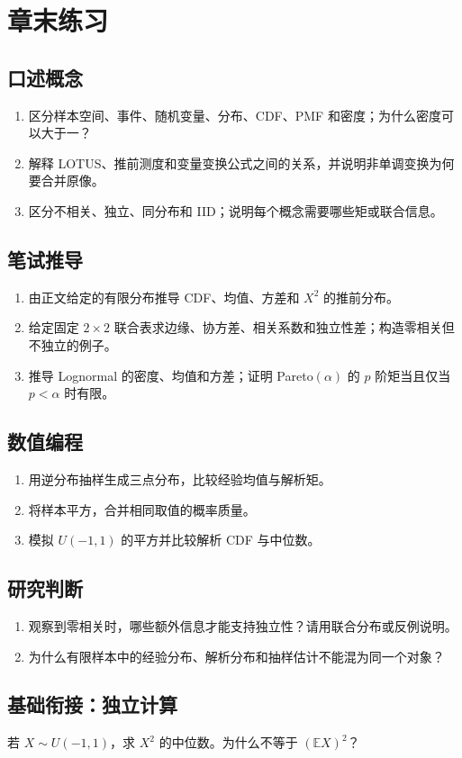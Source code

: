 \section*{章末练习}
\begingroup\small
\subsection*{口述概念}
\begin{enumerate}[nosep,leftmargin=*]
  \item 区分样本空间、事件、随机变量、分布、CDF、PMF 和密度；为什么密度可以大于一？
  \item 解释 LOTUS、推前测度和变量变换公式之间的关系，并说明非单调变换为何要合并原像。
  \item 区分不相关、独立、同分布和 IID；说明每个概念需要哪些矩或联合信息。
\end{enumerate}

\subsection*{笔试推导}
\begin{enumerate}[nosep,leftmargin=*]
  \item 由正文给定的有限分布推导 CDF、均值、方差和 $X^2$ 的推前分布。
  \item 给定固定 $2\times2$ 联合表求边缘、协方差、相关系数和独立性差；构造零相关但不独立的例子。
  \item 推导 Lognormal 的密度、均值和方差；证明 Pareto$(\alpha)$ 的 $p$ 阶矩当且仅当 $p<\alpha$ 时有限。
\end{enumerate}

\subsection*{数值编程}
\begin{enumerate}[leftmargin=*]
  \item 用逆分布抽样生成三点分布，比较经验均值与解析矩。
  \item 将样本平方，合并相同取值的概率质量。
  \item 模拟 $U(-1,1)$ 的平方并比较解析 CDF 与中位数。
\end{enumerate}

\subsection*{研究判断}
\begin{enumerate}[nosep,leftmargin=*]
  \item 观察到零相关时，哪些额外信息才能支持独立性？请用联合分布或反例说明。
  \item 为什么有限样本中的经验分布、解析分布和抽样估计不能混为同一个对象？
\end{enumerate}

\endgroup


\MFQMappedUpperChSevenQuestions

\subsection*{基础衔接：独立计算}
若 $X\sim U(-1,1)$，求 $X^2$ 的中位数。为什么不等于 $(\mathbb EX)^2$？
